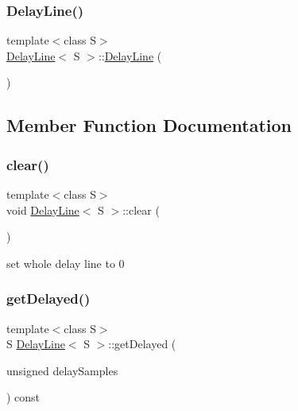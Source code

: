 \mbox{\label{classDelayLine_a43166713f7f497f831d95f348e165f02}} 
\subsubsection{\texorpdfstring{Delay\+Line()}{DelayLine()}\hspace{0.1cm}{\footnotesize\ttfamily [2/2]}}
{\footnotesize\ttfamily template$<$class S$>$ \\
\mbox{\hyperlink{classDelayLine}{Delay\+Line}}$<$ S $>$\+::\mbox{\hyperlink{classDelayLine}{Delay\+Line}} (\begin{DoxyParamCaption}{ }\end{DoxyParamCaption})\hspace{0.3cm}{\ttfamily [inline]}}



\subsection{Member Function Documentation}
\mbox{\label{classDelayLine_a469b230b2f26745a0c648e5504ec5e5c}} 
\subsubsection{\texorpdfstring{clear()}{clear()}}
{\footnotesize\ttfamily template$<$class S$>$ \\
void \mbox{\hyperlink{classDelayLine}{Delay\+Line}}$<$ S $>$\+::clear (\begin{DoxyParamCaption}{ }\end{DoxyParamCaption})\hspace{0.3cm}{\ttfamily [inline]}}



set whole delay line to 0 

\mbox{\label{classDelayLine_ab738e97677b4227684467e1fa65161bd}} 
\subsubsection{\texorpdfstring{get\+Delayed()}{getDelayed()}}
{\footnotesize\ttfamily template$<$class S$>$ \\
S \mbox{\hyperlink{classDelayLine}{Delay\+Line}}$<$ S $>$\+::get\+Delayed (\begin{DoxyParamCaption}\item[{unsigned}]{delay\+Samples }\end{DoxyParamCaption}) const\hspace{0.3cm}{\ttfamily [inline]}}

